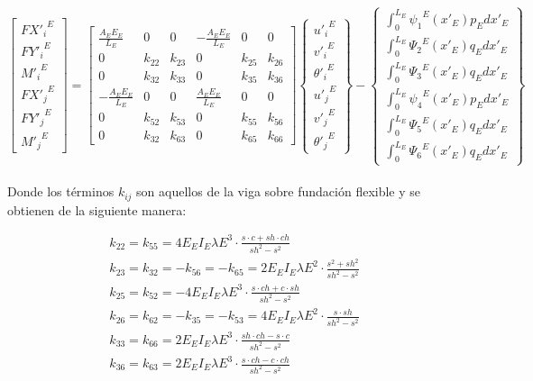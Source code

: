 \documentclass[a4paper]{article}
\begin{document}
{
\renewcommand{\arraystretch}{1.7}
$$
\left[\begin{array}{c}
     {FX'_i}^E  \\ {FY'_i}^E \\ {M'_i}^E \\
     {FX'_j}^E \\ {FY'_j}^E \\ {M'_j}^E
\end{array}\right] = 
\left[\begin{array}{cccccc}
\frac{A_EE_E}{L_E} & 0 & 0  & -\frac{A_EE_E}{L_E} & 0 & 0\\
0 & k_{22} & k_{23} & 0 & k_{25} & k_{26}\\
0 & k_{32} & k_{33} & 0 & k_{35} & k_{36}\\
-\frac{A_EE_E}{L_E} & 0 & 0  & \frac{A_EE_E}{L_E} & 0 & 0\\
0 & k_{52} & k_{53} & 0 & k_{55} & k_{56}\\
0 & k_{32} & k_{63} & 0 & k_{65} & k_{66}
\end{array}\right]
\left\{ \begin{array}{c}
{u'_i}^E \\ {v'_i}^E \\ {{\theta}'_i}^E \\
{u'_j}^E  \\ {v'_j}^E \\ {{\theta}'_j}^E 
\end{array} \right\} - 
\left\{ \begin{array}{c}
\int_{0}^{L_E} {{\psi}_1}^E(x'_E)p_E dx'_E \\ \int_{0}^{L_E} {{\Psi}_2}^E(x'_E)q_E dx'_E \\ \int_{0}^{L_E} {{\Psi}_3}^E(x'_E)q_E dx'_E \\
\int_{0}^{L_E} {{\psi}_4}^E(x'_E)p_E dx'_E  \\ \int_{0}^{L_E} {{\Psi}_5}^E(x'_E)q_E dx'_E \\ \int_{0}^{L_E} {{\Psi}_6}^E(x'_E)q_E dx'_E 
\end{array} \right\}
$$
}
\\
Donde los términos $k_{ij}$ son aquellos de la viga sobre fundación flexible y se obtienen de la siguiente manera:
\begin{subequation}
\begin{align}
    k_{22} = k_{55} = 4E_EI_E{{\lambda}E}^3{\cdot}\frac{s{\cdot}c + sh{\cdot}ch}{sh^2 - s^2}\\
    k_{23} = k_{32} = -k_{56} = -k_{65} = 2E_EI_E{{\lambda}E}^2{\cdot}\frac{s^2 + sh^2}{sh^2 - s^2}\\
    k_{25} = k_{52} = -4E_EI_E{{\lambda}E}^3{\cdot}\frac{s{\cdot}ch + c{\cdot}sh}{sh^2 - s^2}\\
    k_{26} = k_{62} = -k_{35} = -k_{53} = 4E_EI_E{{\lambda}E}^2{\cdot}\frac{s{\cdot}sh}{sh^2 - s^2}\\
    k_{33} = k_{66} = 2E_EI_E{{\lambda}E}^3{\cdot}\frac{sh{\cdot}ch - s{\cdot}c}{sh^2 - s^2}\\
    k_{36} = k_{63} = 2E_EI_E{{\lambda}E}^3{\cdot}\frac{s{\cdot}ch - c{\cdot}ch}{sh^2 - s^2}
\end{align}
\end{subequation}
\end{document}
